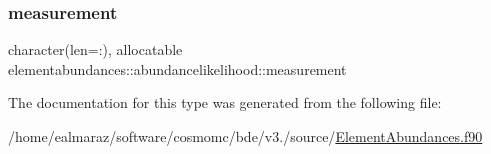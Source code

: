 \mbox{\label{structelementabundances_1_1abundancelikelihood_abf2dfae506f6d987ef304a65731c668e}} 
\subsubsection{\texorpdfstring{measurement}{measurement}}
{\footnotesize\ttfamily character(len=\+:), allocatable elementabundances\+::abundancelikelihood\+::measurement\hspace{0.3cm}{\ttfamily [private]}}



The documentation for this type was generated from the following file\+:\begin{DoxyCompactItemize}
\item 
/home/ealmaraz/software/cosmomc/bde/v3./source/\mbox{\hyperlink{ElementAbundances_8f90}{Element\+Abundances.\+f90}}\end{DoxyCompactItemize}
